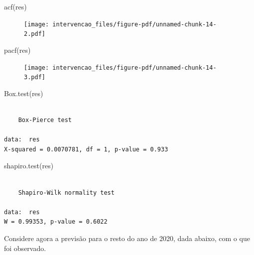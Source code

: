 \documentclass[
  letterpaper,
  DIV=11,
  numbers=noendperiod]{scrartcl}
\newenvironment{Shaded}{\begin{snugshade}}{\end{snugshade}}
\newcommand{\FunctionTok}[1]{\textcolor[rgb]{0.28,0.35,0.67}{#1}}
\newcommand{\NormalTok}[1]{\textcolor[rgb]{0.00,0.23,0.31}{#1}}
\theoremstyle{plain}
\theoremstyle{plain}
\theoremstyle{definition}
\theoremstyle{definition}
\theoremstyle{remark}
\begin{document}
\begin{Shaded}
\begin{Highlighting}[]
\FunctionTok{acf}\NormalTok{(res)}
\end{Highlighting}
\end{Shaded}

\begin{figure}[H]

{\centering \texttt{[image: intervencao\_files/figure-pdf/unnamed-chunk-14-2.pdf]}

}

\end{figure}

\begin{Shaded}
\begin{Highlighting}[]
\FunctionTok{pacf}\NormalTok{(res)}
\end{Highlighting}
\end{Shaded}

\begin{figure}[H]

{\centering \texttt{[image: intervencao\_files/figure-pdf/unnamed-chunk-14-3.pdf]}

}

\end{figure}

\begin{Shaded}
\begin{Highlighting}[]
\FunctionTok{Box.test}\NormalTok{(res)}
\end{Highlighting}
\end{Shaded}

\begin{verbatim}

    Box-Pierce test

data:  res
X-squared = 0.0070781, df = 1, p-value = 0.933
\end{verbatim}

\begin{Shaded}
\begin{Highlighting}[]
\FunctionTok{shapiro.test}\NormalTok{(res)}
\end{Highlighting}
\end{Shaded}

\begin{verbatim}

    Shapiro-Wilk normality test

data:  res
W = 0.99353, p-value = 0.6022
\end{verbatim}

Considere agora a previsão para o resto do ano de 2020, dada abaixo, com
o que foi observado.
\end{document}
